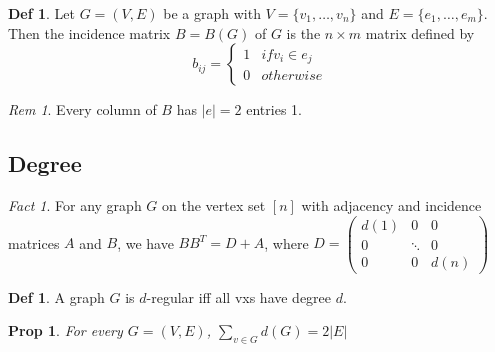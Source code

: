\documentclass[11pt, fleqn, a4paper, landscape]{article}
\theoremstyle{plain} %
\newtheorem{pro}[thm]{Prop}
\theoremstyle{remark} %
\newtheorem{rem}[thm]{Rem}
\newtheorem{nota}[thm]{Not}
\newtheorem{fact}{Fact}
\theoremstyle{definition} %
\newtheorem{defi}[thm]{Def}
\begin{document}
\begin{multicols}{5}
\begin{defi}
Let $G = (V,E)$ be a graph with $V = \{v_1, \dots , v_n\}$ and $E = \{e_1, \dots , e_m\}$. Then the incidence matrix $B = B(G)$ of $G$ is the $n\times m$ matrix defined by \[b_{ij}=\begin{cases}1 & if v_i\in e_j\\ 0 & otherwise\end{cases}\]
\end{defi}
\addtocounter{thm}{1}
\begin{rem}
Every column of $B$ has $|e| = 2$ entries 1.
\end{rem}

\subsection{Degree}

\addtocounter{thm}{1}
\addtocounter{thm}{1} 
\addtocounter{thm}{1}
\begin{fact}
For any graph $G$ on the vertex set $[n]$ with adjacency and incidence matrices $A$ and $B$, we have $BB^T = D + A$, where
$D=
\begin{pmatrix}
d(1) & 0 & 0  \\
0 & \ddots & 0  \\
0 & 0 & d(n)  
\end{pmatrix}
$  
\end{fact}

\addtocounter{thm}{1}

\begin{defi}
A graph $G$ is $d$-regular iff all vxs have degree $d$.
\end{defi}
\addtocounter{thm}{1}
\begin{pro}
For every $G = (V,E)$, $\sum_{v\in G}d(G)=2|E|$
\end{pro}


\end{multicols}
\end{document}
